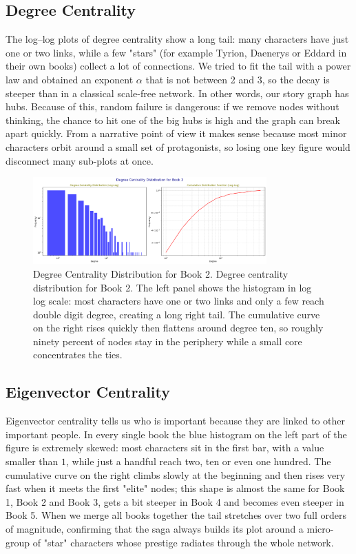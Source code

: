 \documentclass[12pt, a4paper]{article}
\begin{document}
\subsection*{Degree Centrality} 
The log–log plots of degree centrality show a long tail: many characters have just one or two links, while a few "stars" (for example Tyrion, Daenerys or Eddard in their own books) collect a lot of connections.
We tried to fit the tail with a power law and obtained an exponent $\alpha$ that is not between 2 and 3, so the decay is steeper than in a classical scale-free network. In other words, our story graph has hubs. Because of this, random failure is dangerous: if we remove nodes without thinking, the chance to hit one of the big hubs is high and the graph can break apart quickly. From a narrative point of view it makes sense because most minor characters orbit around a small set of protagonists, so losing one key figure would disconnect many sub-plots at once.
\begin{figure}[htbp]
      \centering
      \includegraphics[width=0.8\textwidth]{deg-cent-log-book-2.png}
      \caption{Degree Centrality Distribution for Book 2. Degree centrality distribution for Book 2. The left panel shows the histogram in log log scale: most characters have one or two links and only a few reach double digit degree, creating a long right tail. The cumulative curve on the right rises quickly then flattens around degree ten, so roughly ninety percent of nodes stay in the periphery while a small core concentrates the ties.}
      \label{fig:degcentbook2}
\end{figure}



\subsection*{Eigenvector Centrality}
Eigenvector centrality tells us who is important because they are linked to other important people.
In every single book the blue histogram on the left part of the figure is extremely skewed: most characters sit in the first bar, with a value smaller than $1$, while just a handful reach two, ten or even one hundred.  The cumulative curve on the right climbs slowly at the beginning and then rises very fast when it meets the first "elite" nodes; this shape is almost the same for Book 1, Book 2 and Book 3, gets a bit steeper in Book 4 and becomes even steeper in Book 5.  When we merge all books together the tail stretches over two full orders of magnitude, confirming that the saga always builds its plot around a micro-group of "star" characters whose prestige radiates through the whole network.
\end{document}
